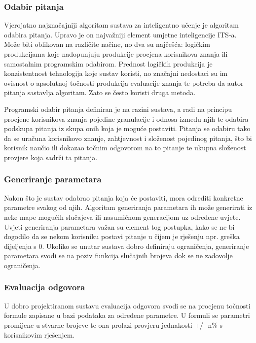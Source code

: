 \documentclass[times, utf8, zavrsni, numeric]{fer}
\begin{document}
\subsubsection{Odabir pitanja}
Vjerojatno najznačajniji algoritam sustava za inteligentno učenje je algoritam odabira pitanja. Upravo je on najvažniji element umjetne inteligencije ITS-a.\citep{aect} Može biti oblikovan na različite načine, no dva su najčešća: logičkim produkcijama koje nadopunjuju produkcije procjena korisnikova znanja ili samostalnim programskim odabirom. Prednost logičkih produkcija je konzistentnost tehnologija koje sustav koristi, no značajni nedostaci su im ovisnost o apsolutnoj točnosti produkcija evaluacije znanja te potreba da autor pitanja sastavlja algoritam. Zato se često koristi druga metoda.
\par
Programski odabir pitanja definiran je na razini sustava, a radi na principu procjene korisnikova znanja pojedine granulacije i odnosa između njih te odabira podskupa pitanja iz skupa onih koja je moguće postaviti. Pitanja se odabiru tako da se uračuna korisnikovo znanje, zahtjevnost i složenost pojedinog pitanja, što bi korisnik naučio ili dokazao točnim odgovorom na to pitanje te ukupna složenost provjere koja sadrži ta pitanja.

\subsubsection{Generiranje parametara}
Nakon što je sustav odabrao pitanja koja će postaviti, mora odrediti konkretne parametre svakog od njih. Algoritam generiranja parametara ih može generirati iz neke mape mogućih slučajeva ili nasumičnom generacijom uz određene uvjete. Uvjeti generiranja parametara važan su element tog postupka, kako se ne bi dogodilo da se nekom korisniku postavi pitanje u čijem je rješenju npr. greška dijeljenja s 0. Ukoliko se unutar sustava dobro definiraju ograničenja, generiranje parametara svodi se na poziv funkcija slučajnih brojeva dok se ne zadovolje ograničenja.

\subsubsection{Evaluacija odgovora}
U dobro projektiranom sustavu evaluacija odgovora svodi se na procjenu točnosti formule zapisane u bazi podataka za određene parametre. U formuli se parametri promijene u stvarne brojeve te ona prolazi provjeru jednakosti +/- n\% s korisnikovim rješenjem.
\end{document}
